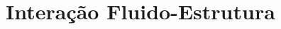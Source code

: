\documentclass[tese_patricia]{subfiles}
\begin{document}
	

\chapter[Acoplamento Fluido-Estrutura]{Interação Fluido-Estrutura} \label{capitulo:Cap7}
\end{document}
